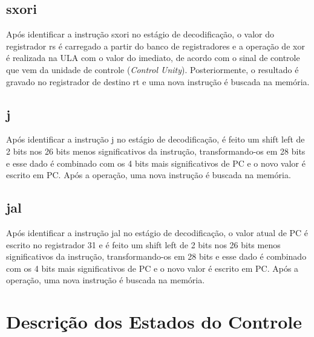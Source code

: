 \documentclass{article}
\begin{document}
    \subsection{sxori}
    Após identificar a instrução sxori no estágio de decodificação, o valor do registrador rs é carregado a partir do banco de registradores e a operação de xor é realizada na ULA com o valor do imediato, de acordo com o sinal de controle que vem da unidade de controle ({\it Control Unity}). Posteriormente, o resultado é gravado no registrador de destino rt e uma nova instrução é buscada na memória.
    
    \subsection{j}
    Após identificar a instrução j no estágio de decodificação, é feito um shift left de 2 bits nos 26 bits menos significativos da instrução, transformando-os em 28 bits e esse dado é combinado com os 4 bits mais significativos de PC e o novo valor é escrito em PC. Após a operação, uma nova instrução é buscada na memória.
    \\
    \subsection{jal}
    Após identificar a instrução jal no estágio de decodificação, o valor atual de PC é escrito no registrador 31 e é feito um shift left de 2 bits nos 26 bits menos significativos da instrução, transformando-os em 28 bits e esse dado é combinado com os 4 bits mais significativos de PC e o novo valor é escrito em PC. Após a operação, uma nova instrução é buscada na memória.
    
    
    \newpage
    \section{Descrição dos Estados do Controle}
\end{document}

